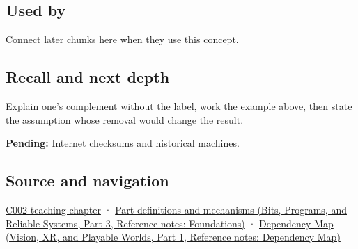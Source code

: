 \subsection{Used by}\label{appendix-03c678cd40b3-used-by}

\hypertarget{appendix-03c678cd40b3-used-by}{}

Connect later chunks here when they use this concept.

\subsection{Recall and next depth}\label{appendix-03c678cd40b3-recall-and-next-depth}

\hypertarget{appendix-03c678cd40b3-recall-and-next-depth}{}

Explain one's complement without the label, work the example above, then state the assumption whose removal would change the result.

\textbf{Pending:} Internet checksums and historical machines.

\subsection{Source and navigation}\label{appendix-03c678cd40b3-source-and-navigation}

\hypertarget{appendix-03c678cd40b3-source-and-navigation}{}

\hyperref[01-foundations-i-ch001-arithmetic-becomes-a-policy]{C002 teaching chapter} · \href{../01-Bits-Programs-and-Reliable-Systems-P03/main.pdf\#nameddest=appendix-fd090d982a15}{Part definitions and mechanisms (Bits, Programs, and Reliable Systems, Part 3, Reference notes: Foundations)} · \href{../07-Vision-XR-and-Playable-Worlds-P01/main.pdf\#nameddest=appendix-4ad47bdd269a}{Dependency Map (Vision, XR, and Playable Worlds, Part 1, Reference notes: Dependency Map)}
